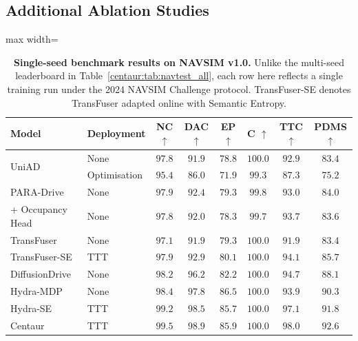 \subsection{Additional Ablation Studies}\label{centaur:app:ablations}

\begin{table}[t]
  \centering
  \caption[Single-seed NAVSIM v1.0 benchmark results]{\textbf{Single-seed benchmark results on NAVSIM v1.0.} Unlike the multi-seed leaderboard in Table~\ref{centaur:tab:navtest_all}, each row here reflects a single training run under the 2024 NAVSIM Challenge protocol. TransFuser-SE denotes TransFuser adapted online with Semantic Entropy.}
  \label{centaur:tab:navtest_all_supp}
  \begin{adjustbox}{max width=\textwidth}
  \begin{tabular}{ll|cccc|cc}
    \toprule
    \textbf{Model} & \textbf{Deployment} & \textbf{NC} $\uparrow$ & \textbf{DAC} $\uparrow$ & \textbf{EP} $\uparrow$ & \textbf{C} $\uparrow$ & \textbf{TTC} $\uparrow$ & \textbf{PDMS} $\uparrow$ \\
    \midrule
    \multirow{2}{*}{UniAD~\cite{hu2023uniad}} & None & $97.8$ & $91.9$ & $78.8$ & $100.0$ & $92.9$ & $83.4$ \\
    & Optimisation & $95.4$ & $86.0$ & $71.9$ & $99.3$ & $87.3$ & $75.2$ \\
    \midrule
    PARA-Drive~\cite{weng2024paradrive} & None & $97.9$ & $92.4$ & $79.3$ & $99.8$ & $93.0$ & $84.0$ \\
    + Occupancy Head & None & $97.8$ & $92.0$ & $78.3$ & $99.7$ & $93.7$ & $83.6$ \\
    \midrule
    TransFuser~\cite{chitta2023transfuser} & None & $97.1$ & $91.9$ & $79.3$ & $100.0$ & $91.9$ & $83.4$ \\
    TransFuser-SE & TTT & $97.9$ & $92.9$ & $80.1$ & $100.0$ & $94.1$ & $85.7$ \\
    \midrule
    DiffusionDrive~\cite{liao2025diffusiondrive} & None & $98.2$ & $96.2$ & $82.2$ & $100.0$ & $94.7$ & $88.1$ \\
    \midrule
    Hydra-MDP~\cite{li2024hydramdp} & None & $98.4$ & $97.8$ & $86.5$ & $100.0$ & $93.9$ & $90.3$ \\
    Hydra-SE & TTT & $99.2$ & $98.5$ & $85.7$ & $100.0$ & $97.1$ & $91.8$ \\
    Centaur & TTT & $99.5$ & $98.9$ & $85.9$ & $100.0$ & $98.0$ & $92.6$ \\
    \bottomrule
  \end{tabular}
  \end{adjustbox}
\end{table}

